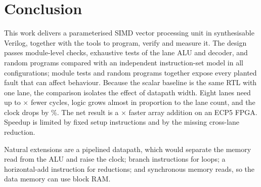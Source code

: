 \documentclass[conference]{IEEEtran}
\begin{document}
\section{Conclusion}
\label{sec:conclusion}
This work delivers a parameterised SIMD vector processing unit in
synthesisable Verilog, together with the tools to program, verify and measure
it. The design passes \ModuleChecks{} module-level checks, exhaustive tests of
the lane ALU and decoder, and \RandPrograms{} random programs compared with an
independent instruction-set model in all \MatrixConfigs{} configurations;
module tests and random programs together expose every planted fault that
can affect behaviour. Because the scalar baseline is the same RTL with one lane,
the comparison isolates the effect of datapath width. Eight lanes need up to
\SpeedupThreeEight$\times$ fewer cycles, logic grows almost in proportion to
the lane count, and the clock drops by \ClockLossEight\%. The net result is a
\EffOneEight$\times$ faster array addition on an ECP5 FPGA. Speedup is limited by fixed
setup instructions and by the missing cross-lane reduction.

Natural extensions are a pipelined datapath, which would separate the memory
read from the ALU and raise the clock; branch instructions for loops;
a horizontal-add instruction for reductions; and synchronous memory reads, so
the data memory can use block RAM.



\end{document}
